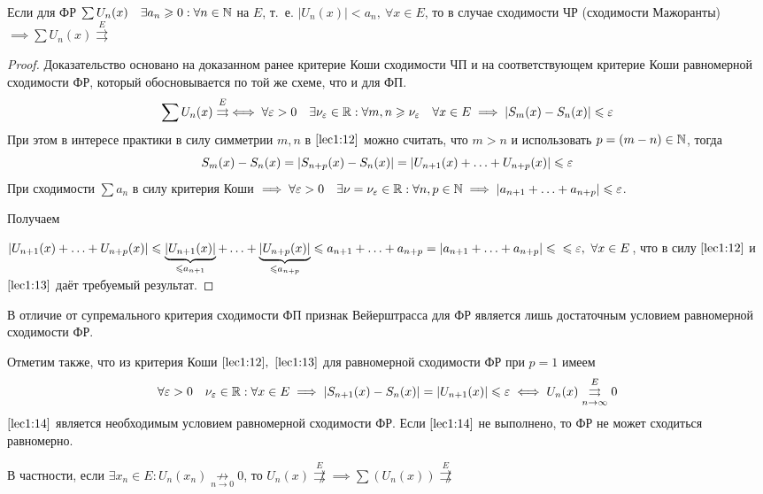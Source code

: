 \documentclass[../../main.tex]{subfiles}
\begin{document}
\begin{thm} 
Если для ФР $\sum U_n(x) \quad \exists a_n \geqslant 0 : \forall n \in \mathbb{N}$ на $E$,
т.~е. $|U_n(x)| < a_n,\ \forall x \in E$, то в случае сходимости 
ЧР (сходимости Мажоранты) $\implies \sum U_n(x) \overset{E}{\rightrightarrows}$
\end{thm}	 

\begin{proof}
Доказательство основано на доказанном ранее критерие Коши сходимости ЧП и на
соответствующем критерие Коши равномерной сходимости ФР, который обосновывается
по той же схеме, что и для ФП.
\begin{equation}
\label{lec1:12}
\sum U_n(x) \overset{E}{\rightrightarrows} \iff \forall \varepsilon > 0 \quad
\exists \nu_\varepsilon \in \mathbb{R} : \forall m,n \geqslant \nu_\varepsilon \quad
\forall x \in E \implies
|S_m(x) - S_n(x)| \leqslant \varepsilon
\end{equation}
При этом в интересе практики в силу симметрии $m,n$ в $\eqref{lec1:12}$ можно
считать, что $m > n$ и использовать $p = (m - n) \in \mathbb{N}$, тогда 
\begin{equation}
\label{lec1:13}
S_m(x) - S_n(x) = |S_{n+p}(x) - S_n(x)| =
|U_{n+1}(x) + \ldots + U_{n+p}(x)| \leqslant \varepsilon
\end{equation}
При сходимости $\sum a_n$ в силу критерия Коши $\implies
\forall \varepsilon > 0 \quad \exists \nu = \nu_\varepsilon \in \mathbb{R} : 
\forall n, p \in \mathbb{N} \implies
|a_{n+1} + \ldots + a_{n+p}| \leqslant \varepsilon$.

Получаем

$|U_{n+1}(x) + \ldots + U_{n+p}(x)| \leqslant 
\underbrace{|U_{n+1}(x)|}_{\leqslant a_{n+1}} + \ldots + 
\underbrace{|U_{n+p}(x)|}_{\leqslant a_{n+p}} \leqslant
a_{n+1} + \ldots + a_{n+p} = |a_{n+1} + \ldots + a_{n+p}| \leqslant \\
\leqslant \varepsilon,\ \forall x\in E$, что в силу $\eqref{lec1:12}$ и 
$\eqref{lec1:13}$ даёт требуемый результат.
\end{proof}	

\begin{rem}
В отличие от супремального критерия сходимости ФП
признак Вейерштрасса для ФР является лишь достаточным условием 
равномерной сходимости ФР. 
\end{rem}	

Отметим также, что из критерия Коши $\eqref{lec1:12},\ \eqref{lec1:13}$ 
для равномерной сходимости ФР при $p=1$ имеем
\begin{equation}
\label{lec1:14}
\forall \varepsilon > 0 \quad
\nu_\varepsilon \in \mathbb{R} : \forall x \in E \implies
|S_{n+1}(x) - S_n(x)| = |U_{n+1}(x)| \leqslant \varepsilon \iff
U_n(x) \overset{E}
{\underset{n \to \infty}\rightrightarrows} 0
\end{equation} 
$\eqref{lec1:14}$ является необходимым условием равномерной сходимости ФР.
Если $\eqref{lec1:14}$ не выполнено, то ФР не может сходиться равномерно.

В частности, если 
$\exists x_n \in E : U_n(x_n) \underset{n \to 0}{\not \rightarrow} 0$, то
$U_n(x) \overset{E}{\not \rightrightarrows} \implies
\sum (U_n(x)) \overset{E}{\not \rightrightarrows}$
\end{document}
